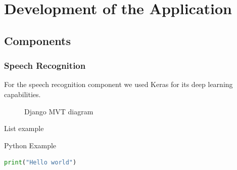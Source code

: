 \chapter{Development of the Application}

\section{Components}

\subsection{Speech Recognition}

For the speech recognition component we used Keras for its deep learning capabilities.

\begin{figure}[ht!]
  \caption{Django MVT diagram}
  \label{fig:mvt_architecture}
\end{figure}


List example

\medskip

Python Example

\begin{lstlisting}[language=Python]
print("Hello world")
\end{lstlisting}

\medskip
